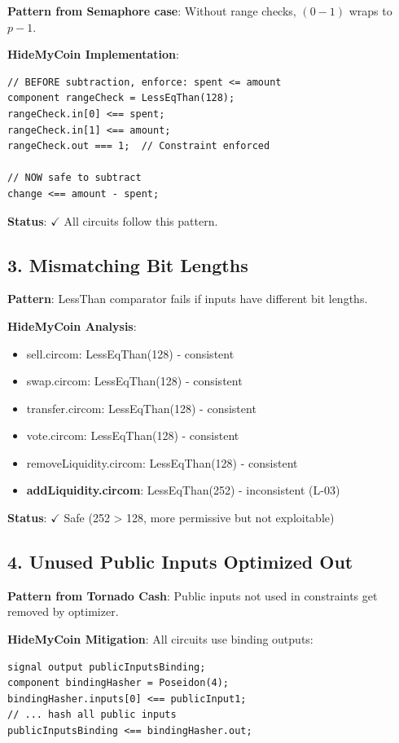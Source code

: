 \documentclass[11pt,a4paper]{article}
\begin{document}
\textbf{Pattern from Semaphore case}: Without range checks, $(0 - 1)$ wraps to $p-1$.

\textbf{HideMyCoin Implementation}:
\begin{lstlisting}[style=circom]
// BEFORE subtraction, enforce: spent <= amount
component rangeCheck = LessEqThan(128);
rangeCheck.in[0] <== spent;
rangeCheck.in[1] <== amount;
rangeCheck.out === 1;  // Constraint enforced

// NOW safe to subtract
change <== amount - spent;
\end{lstlisting}

\textbf{Status}: $\checkmark$ All circuits follow this pattern.

\subsection{3. Mismatching Bit Lengths}

\textbf{Pattern}: LessThan comparator fails if inputs have different bit lengths.

\textbf{HideMyCoin Analysis}:
\begin{itemize}
    \item sell.circom: LessEqThan(128) - consistent
    \item swap.circom: LessEqThan(128) - consistent
    \item transfer.circom: LessEqThan(128) - consistent
    \item vote.circom: LessEqThan(128) - consistent
    \item removeLiquidity.circom: LessEqThan(128) - consistent
    \item \textbf{addLiquidity.circom}: LessEqThan(252) - inconsistent (L-03)
\end{itemize}

\textbf{Status}: $\checkmark$ Safe (252 > 128, more permissive but not exploitable)

\subsection{4. Unused Public Inputs Optimized Out}

\textbf{Pattern from Tornado Cash}: Public inputs not used in constraints get removed by optimizer.

\textbf{HideMyCoin Mitigation}: All circuits use binding outputs:
\begin{lstlisting}[style=circom]
signal output publicInputsBinding;
component bindingHasher = Poseidon(4);
bindingHasher.inputs[0] <== publicInput1;
// ... hash all public inputs
publicInputsBinding <== bindingHasher.out;
\end{lstlisting}
\end{document}
